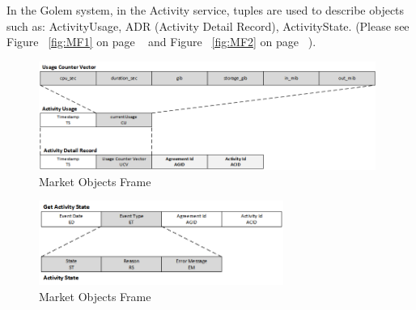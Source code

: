 
In the Golem system, in the Activity service, tuples are used to describe objects such as:
ActivityUsage, ADR (Activity Detail Record), ActivityState. (Please see Figure ~\ref{fig:MF1} on page ~\pageref{fig:MF1}
and Figure ~\ref{fig:MF2} on page ~\pageref{fig:MF2}).

\begin{figure}[H]
    \centering
    \includegraphics[width=11cm,angle=0]{./diag/Reference/ActivityFrame-1-Reference.png}
	\caption{Market Objects Frame}
    \label{fig:AF1}
\end{figure}


\begin{figure}[H]
    \centering
    \includegraphics[width=8cm,angle=0]{./diag/Reference/ActivityFrame-2-Reference.png}
	\caption{Market Objects Frame}
    \label{fig:AF2}
\end{figure}


